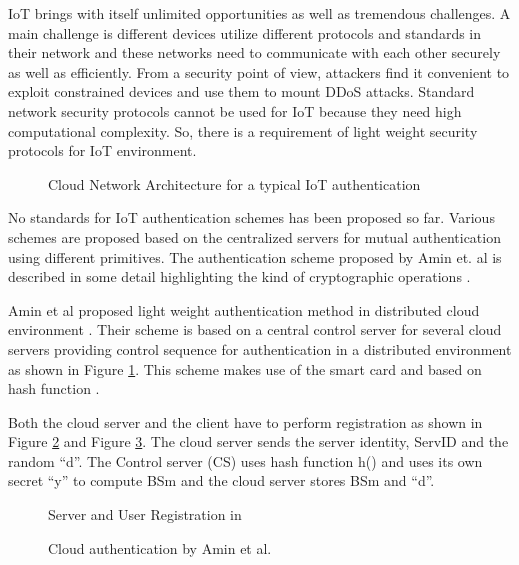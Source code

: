 \begin{multicols}{2}
IoT brings with itself unlimited opportunities as well as tremendous challenges. A main challenge is different devices utilize different protocols and standards in their network and these networks need to communicate with each other securely as well as efficiently. From a security point of view, attackers find it convenient to exploit constrained devices and use them to mount DDoS attacks. Standard network security protocols cannot be used for IoT because they need high computational complexity. So, there is a requirement of light weight security protocols for IoT environment. 
\begin{figure}[!ht]
\centering
\caption{Cloud Network Architecture for a typical IoT authentication}\label{chap2-fig6}
\end{figure}

No standards for IoT authentication schemes has been proposed so far. Various schemes are proposed based on the centralized servers for mutual authentication using different primitives. The authentication scheme proposed by Amin et. al is described in some detail highlighting the kind of cryptographic operations \cite{key22}.

Amin et al proposed light weight authentication method in distributed cloud environment \cite{key19}. Their scheme is based on a central control server for several cloud servers providing control sequence for authentication in a distributed environment as shown in Figure \ref{chap2-fig6}. This scheme makes use of the smart card and based on hash function \cite{key23}.

Both the cloud server and the client have to perform registration as shown in Figure \ref{chap2-fig7} and Figure \ref{chap2-fig8}. The cloud server sends the server identity, ServID and the random ``d''. The Control server (CS) uses hash function h() and uses its own secret ``y'' to compute BSm and the cloud server stores BSm and ``d''.
\begin{figure}[!ht]
\centering
\caption{Server and User Registration in \cite{key20}}\label{chap2-fig7}
\end{figure}

\begin{figure}[!ht]
\centering
\caption{Cloud authentication by Amin et al. \cite{key20}}\label{chap2-fig8}
\end{figure}


\end{multicols}
